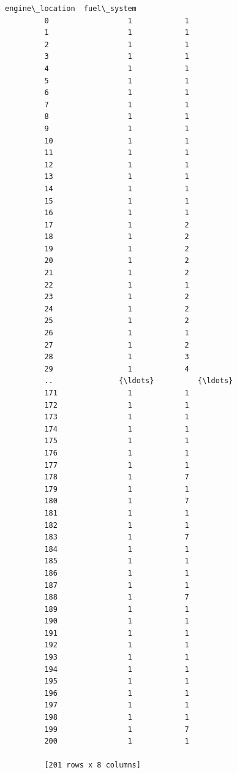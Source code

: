 \documentclass[11pt]{article}
\begin{document}
\begin{Verbatim}[commandchars=\\\{\}]
              engine\_location  fuel\_system  
         0                  1            1  
         1                  1            1  
         2                  1            1  
         3                  1            1  
         4                  1            1  
         5                  1            1  
         6                  1            1  
         7                  1            1  
         8                  1            1  
         9                  1            1  
         10                 1            1  
         11                 1            1  
         12                 1            1  
         13                 1            1  
         14                 1            1  
         15                 1            1  
         16                 1            1  
         17                 1            2  
         18                 1            2  
         19                 1            2  
         20                 1            2  
         21                 1            2  
         22                 1            1  
         23                 1            2  
         24                 1            2  
         25                 1            2  
         26                 1            1  
         27                 1            2  
         28                 1            3  
         29                 1            4  
         ..               {\ldots}          {\ldots}  
         171                1            1  
         172                1            1  
         173                1            1  
         174                1            1  
         175                1            1  
         176                1            1  
         177                1            1  
         178                1            7  
         179                1            1  
         180                1            7  
         181                1            1  
         182                1            1  
         183                1            7  
         184                1            1  
         185                1            1  
         186                1            1  
         187                1            1  
         188                1            7  
         189                1            1  
         190                1            1  
         191                1            1  
         192                1            1  
         193                1            1  
         194                1            1  
         195                1            1  
         196                1            1  
         197                1            1  
         198                1            1  
         199                1            7  
         200                1            1  
         
         [201 rows x 8 columns]
\end{Verbatim}
            
\end{document}
